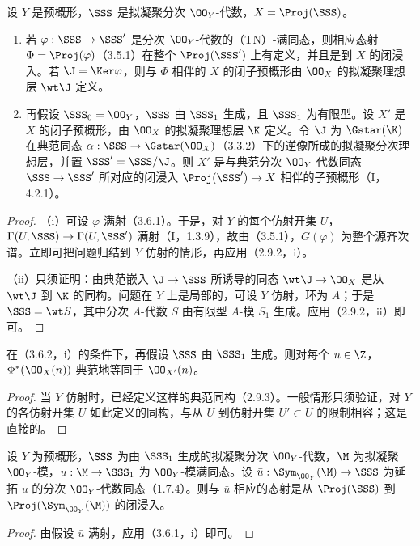 设 $Y$ 是预概形，$\SSS$ 是拟凝聚分次 $\OO_Y$-代数，$X=\Proj(\SSS)$。
\begin{enumerate}[label=(\roman*)]
\item 若 $\varphi:\SSS\to\SSS'$ 是分次 $\OO_Y$-代数的（TN）-满同态，则相应态射 $\Phi=\Proj(\varphi)$（3.5.1）在整个 $\Proj(\SSS')$ 上有定义，并且是到 $X$ 的闭浸入。若 $\J=\Ker\varphi$，则与 $\Phi$ 相伴的 $X$ 的闭子预概形由 $\OO_X$ 的拟凝聚理想层 $\wt\J$ 定义。
\item 再假设 $\SSS_0=\OO_Y$，$\SSS$ 由 $\SSS_1$ 生成，且 $\SSS_1$ 为有限型。设 $X'$ 是 $X$ 的闭子预概形，由 $\OO_X$ 的拟凝聚理想层 $\K$ 定义。令 $\J$ 为 $\Gstar(\K)$ 在典范同态 $\alpha:\SSS\to\Gstar(\OO_X)$（3.3.2）下的逆像所成的拟凝聚分次理想层，并置 $\SSS'=\SSS/\J$。则 $X'$ 是与典范分次 $\OO_Y$-代数同态 $\SSS\to\SSS'$ 所对应的闭浸入 $\Proj(\SSS')\to X$ 相伴的子预概形（I，4.2.1）。
\end{enumerate}
\begin{proof}
（i）可设 $\varphi$ 满射（3.6.1）。于是，对 $Y$ 的每个仿射开集 $U$，$\Gamma(U,\SSS)\to\Gamma(U,\SSS')$ 满射（I，1.3.9），故由（3.5.1），$G(\varphi)$ 为整个源齐次谱。立即可把问题归结到 $Y$ 仿射的情形，再应用（2.9.2，i）。

（ii）只须证明：由典范嵌入 $\J\to\SSS$ 所诱导的同态 $\wt\J\to\OO_X$ 是从 $\wt\J$ 到 $\K$ 的同构。问题在 $Y$ 上是局部的，可设 $Y$ 仿射，环为 $A$；于是 $\SSS=\wt S$，其中分次 $A$-代数 $S$ 由有限型 $A$-模 $S_1$ 生成。应用（2.9.2，ii）即可。
\end{proof}

在（3.6.2，i）的条件下，再假设 $\SSS$ 由 $\SSS_1$ 生成。则对每个 $n\in\Z$，$\Phi^*(\OO_X(n))$ 典范地等同于 $\OO_{X'}(n)$。
\begin{proof}
当 $Y$ 仿射时，已经定义这样的典范同构（2.9.3）。一般情形只须验证，对 $Y$ 的各仿射开集 $U$ 如此定义的同构，与从 $U$ 到仿射开集 $U'\subset U$ 的限制相容；这是直接的。
\end{proof}

设 $Y$ 为预概形，$\SSS$ 为由 $\SSS_1$ 生成的拟凝聚分次 $\OO_Y$-代数，$\M$ 为拟凝聚 $\OO_Y$-模，$u:\M\to\SSS_1$ 为 $\OO_Y$-模满同态。设 $\bar u:\Sym_{\OO_Y}(\M)\to\SSS$ 为延拓 $u$ 的分次 $\OO_Y$-代数同态（1.7.4）。则与 $\bar u$ 相应的态射是从 $\Proj(\SSS)$ 到 $\Proj(\Sym_{\OO_Y}(\M))$ 的闭浸入。
\begin{proof}
由假设 $\bar u$ 满射，应用（3.6.1，i）即可。
\end{proof}

